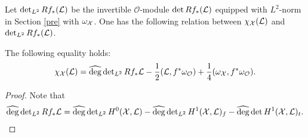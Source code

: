 \documentclass[]{amsart}
\newcommand{\CO}{{\mathcal {O}}} \newcommand{\CP}{{\mathcal {P}}}
\newcommand{\wh}{\widehat}
\newcommand{\sk}{\medskip}\newcommand{\bsk}{\bigskip}
\newcommand{\s}{\sk\noindent}\newcommand{\bigs}{\bsk\noindent}
\theoremstyle{plain}
\theoremstyle{remark} \newtheorem{remark}[thm]{Remark}
\theoremstyle{remark} \newtheorem{exercise}{Exercise}
\theoremstyle{remark} \newtheorem{example}{Example}
\numberwithin{equation}{section}
\begin{document}
Let $\det_{L^2}Rf_*({\mathcal {L}})$ be the invertible $\CO$-module $\det Rf_*({\mathcal {L}})$ equipped with $L^2$-norm in Section \s\ref{pre} with $\omega_{{\mathcal {X}}}$.
One has the following relation between $\chi_{{\mathcal {X}}}({\mathcal {L}})$ and $\det_{L^2}Rf_*({\mathcal {L}})$.

\begin{prop}\label{com}
The following equality holds: 
\[
 \chi_{\CX}(\CL)=\wh{\deg}\det\nolimits_{L^2}Rf_*\CL-\frac{1}{2}(\CL,f^*\omega_{\CO})+\frac{1}{4}(\omega_{\CX},f^*\omega_{\CO}).
\]

\end{prop}
\begin{proof}
Note that
  \[\begin{aligned}
    \wh{\deg}\det\nolimits_{L^2} Rf_* \CL=\wh{\deg}\det\nolimits_{L^2}H^0(\CX,\CL)-\wh{\deg}\det\nolimits_{L^2}H^1(\CX,\CL)_f-\wh{\deg}\det H^1(\CX,\CL)_t.
  \end{aligned}\]


\end{proof}
\end{document}

